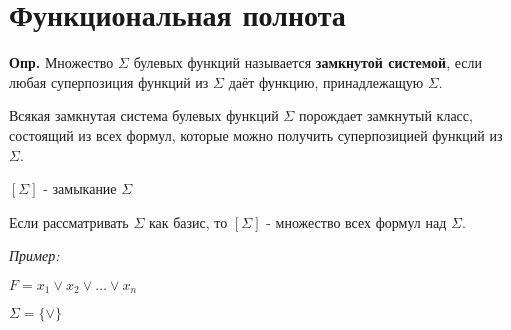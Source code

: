 \documentclass[10pt]{article}
\begin{document}
\section*{Функциональная полнота}
\par\textbf{Опр.} Множество $\Sigma$ булевых функций называется \textbf{замкнутой системой}, если любая суперпозиция функций из $\Sigma$ даёт функцию, принадлежащую $\Sigma$.
\par Всякая замкнутая система булевых функций $\Sigma$ порождает замкнутый класс, состоящий из всех формул, которые можно получить суперпозицией функций из $\Sigma$.
\par $[\Sigma]$ - замыкание $\Sigma$
\par Если рассматривать $\Sigma$ как базис, то $[\Sigma]$ - множество всех формул над $\Sigma$.
\par\textit{Пример:}
\par $F = x_1 \lor x_2 \lor \dots \lor x_n$
\par $\Sigma = \{ \lor \}$
\end{document}
